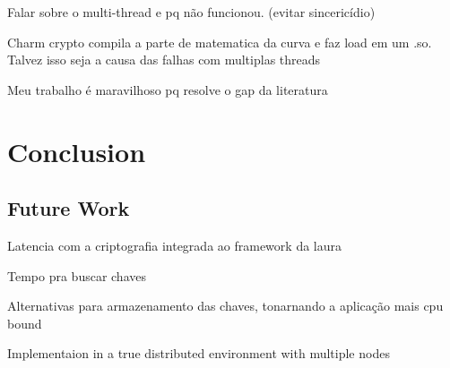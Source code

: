 \documentclass[cic,tc,english]{iiufrgs}
\begin{document}
            Falar sobre o multi-thread e pq não funcionou. (evitar sincericídio)

            Charm crypto compila a parte de matematica da curva e faz load em um .so. Talvez isso seja a causa das falhas com multiplas threads

            Meu trabalho é maravilhoso pq resolve o gap da literatura


\chapter{Conclusion}
    \label{chap:conclusion}

    \section{Future Work}
        \label{sec:futurework}
        Latencia com a criptografia integrada ao framework da laura

        Tempo pra buscar chaves

        Alternativas para armazenamento das chaves, tonarnando a aplicação mais cpu bound

        Implementaion in a true distributed environment with multiple nodes




\end{document}
